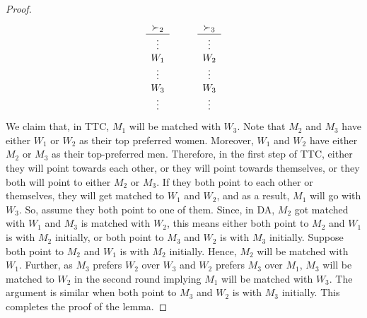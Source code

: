 \begin{proof}
\[  \begin{array}{c}
	\succ_2 \\
	\hline
	\vdots \\
	W_1\\
        \vdots\\
        W_3\\
        \vdots
\end{array} 
\hspace{10mm}
%
\begin{array}{c}
	\succ_3 \\
	\hline
	\vdots \\
	W_2\\
        \vdots\\
        W_3\\
        \vdots
\end{array} 
\]
We claim that, in TTC, $M_1$ will be matched with $W_3$. Note that $M_2$ and $M_3$ have either $W_1$ or $W_2$ as their top preferred women. Moreover, $W_1$ and $W_2$ have either $M_2$ or $M_3$ as their top-preferred men. Therefore, in the first step of TTC, either they will point towards each other, or they will point towards themselves, or they both will point to either $M_2$ or $M_3$. 
If they both point to each other or themselves, they will get matched to $W_1$ and $W_2$, and as a result, $M_1$ will go with $W_3$. So, assume they both point to one of them. Since, in DA, $M_2$ got matched with $W_1$ and $M_3$ is matched with $W_2$, this means either both point to $M_2$ and $W_1$ is with $M_2$ initially, or both point to $M_3$ and $W_2$ is with $M_3$ initially. Suppose both point to $M_2$ and $W_1$ is with $M_2$ initially. Hence, $M_2$ will be matched with $W_1$. Further, as $M_3$ prefers $W_2$ over $W_3$ and $W_2$ prefers $M_3$ over $M_1$, $M_3$ will be matched to $W_2$ in the second round implying $M_1$ will be matched with $W_3$. The argument is similar when both point to $M_3$ and $W_2$ is with $M_3$ initially. This completes the proof of the lemma.
\end{proof}


